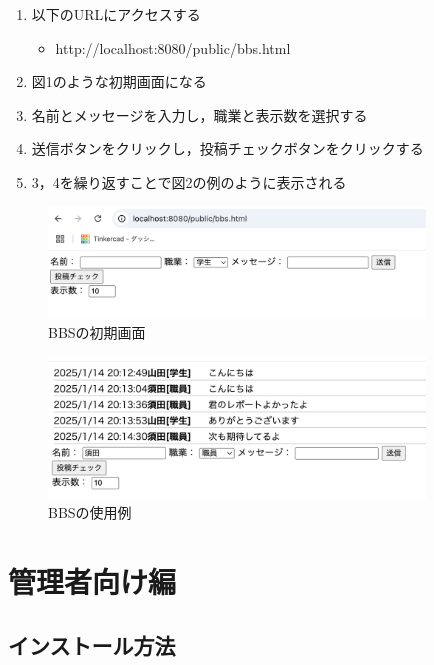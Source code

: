 \documentclass[uplatex,dvipdfmx]{jsarticle}
\begin{document}
\begin{enumerate}
	\item 以下のURLにアクセスする
	\begin{itemize}
		\item http://localhost:8080/public/bbs.html 
	\end{itemize}
	\item 図1のような初期画面になる
	\item 名前とメッセージを入力し，職業と表示数を選択する
	\item 送信ボタンをクリックし，投稿チェックボタンをクリックする
	\item 3，4を繰り返すことで図2の例のように表示される
\end{enumerate}


\begin{figure}[h]
\centering
 \centering
\includegraphics[width=10cm]{./syoki.png}
\caption{BBSの初期画面}
\label{fig:problem}
\end{figure}


\begin{figure}[h]
\centering
 \centering
\includegraphics[width=10cm]{./rei.png}
\caption{BBSの使用例}
\label{fig:problem}
\end{figure}



\section{管理者向け編}
\subsection{インストール方法}
\end{document}
